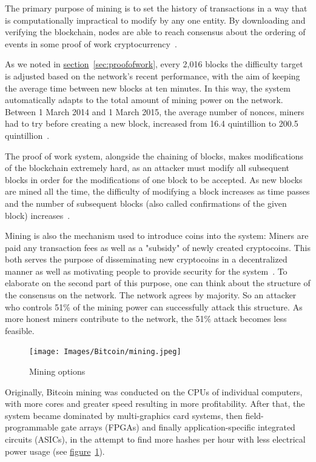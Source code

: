 The primary purpose of mining is to set the history of transactions in a way that is computationally impractical to modify by any one entity. By downloading and verifying the blockchain, nodes are able to reach consensus about the ordering of events in some proof of work cryptocurrency~\cite{wiki}.

As we noted in \hyperref[sec:proofofwork]{section}~\ref{sec:proofofwork}, every 2,016 blocks the difficulty target is adjusted based on the network's recent performance, with the aim of keeping the average time between new blocks at ten minutes. In this way, the system automatically adapts to the total amount of mining power on the network. Between 1 March 2014 and 1 March 2015, the average number of nonces, miners had to try before creating a new block, increased from 16.4 quintillion to 200.5 quintillion~\cite{difficulty_history}.

The proof of work system, alongside the chaining of blocks, makes modifications of the blockchain extremely hard, as an attacker must modify all subsequent blocks in order for the modifications of one block to be accepted. As new blocks are mined all the time, the difficulty of modifying a block increases as time passes and the number of subsequent blocks (also called confirmations of the given block) increases~\cite{economist}.

Mining is also the mechanism used to introduce coins into the system: Miners are paid any transaction fees as well as a "subsidy" of newly created cryptocoins. This both serves the purpose of disseminating new cryptocoins in a decentralized manner as well as motivating people to provide security for the system~\cite{wiki}. To elaborate on the second part of this purpose, one can think about the structure of the consensus on the network. The network agrees by majority. So an attacker who controls 51\% of the mining power can successfully attack this structure. As more honest miners contribute to the network, the 51\% attack becomes less feasible.

\begin{figure}
  \centering
  \texttt{[image: Images/Bitcoin/mining.jpeg]}
  \caption{Mining options}
  \label{fig:mining}
\end{figure}
Originally, Bitcoin mining was conducted on the CPUs of individual computers, with more cores and greater speed resulting in more profitability. After that, the system became dominated by multi-graphics card systems, then field-programmable gate arrays (FPGAs) and finally application-specific integrated circuits (ASICs), in the attempt to find more hashes per hour with less electrical power usage (see \hyperref[fig:mining]{figure}~\ref{fig:mining}).

